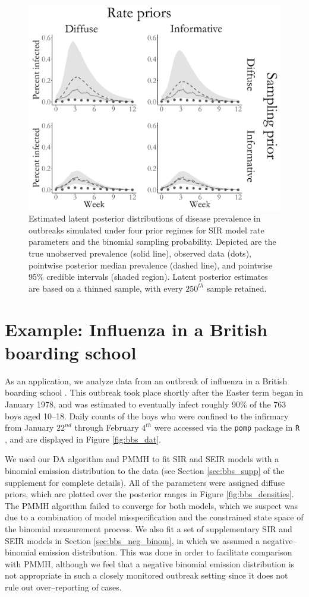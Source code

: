 \begin{figure}[htbp]
	\centering
	\includegraphics[width=0.6\linewidth]{figures/prior_latent_posts.pdf}
	\caption[Estimated latent posterior for an SIR model under four prior regimes.]{Estimated latent posterior distributions of disease prevalence in outbreaks simulated under four prior regimes for SIR model rate parameters and the binomial sampling probability. Depicted are the true unobserved prevalence (solid line), observed data (dots), pointwise posterior median prevalence (dashed line), and pointwise 95\% credible intervals (shaded region). Latent posterior estimates are based on a thinned sample, with every $250^{th}$ sample retained.}
	\label{fig:prior_latent_posts}
\end{figure}

\section{Example: Influenza in a British boarding school}
\label{sec:bda_bbs}

As an application, we analyze data from an outbreak of influenza in a British boarding school \citep{anon1978, davies1982}. This outbreak took place shortly after the Easter term began in January 1978, and was estimated to eventually infect roughly 90\% of the 763 boys aged 10--18. Daily counts of the boys who were confined to the infirmary from January $22^{nd}$ through February $4^{th}$ were accessed via the \texttt{pomp} package in \texttt{R} \citep{pomp}, and are displayed in Figure \ref{fig:bbs_dat}. 

We used our DA algorithm and PMMH to fit SIR and SEIR models with a binomial emission distribution to the data (see Section \ref{sec:bbs_supp} of the supplement for complete details). All of the parameters were assigned diffuse priors, which are plotted over the posterior ranges in Figure \ref{fig:bbs_densities}. The PMMH algorithm failed to converge for both models, which we suspect was due to a combination of model misspecification and the constrained state space of the binomial measurement process. We also fit a set of supplementary SIR and SEIR models in Section \ref{sec:bbs_neg_binom}, in which we assumed a negative--binomial emission distribution. This was done in order to facilitate comparison with PMMH, although we feel that a negative binomial emission distribution is not appropriate in such a closely monitored outbreak setting since it does not rule out over--reporting of cases.

